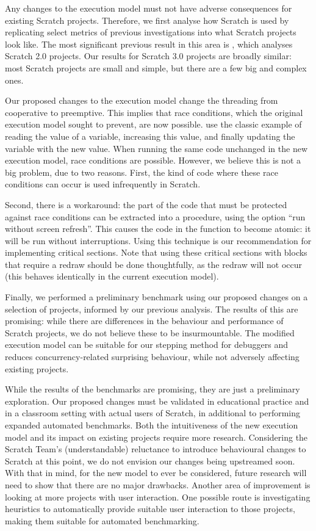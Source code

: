 \documentclass[../main]{subfiles}
\begin{document}
Any changes to the execution model must not have adverse consequences for existing Scratch projects.
Therefore, we first analyse how Scratch is used by replicating select metrics of previous investigations into what Scratch projects look like.
The most significant previous result in this area is \textcite{aivaloglouHowKidsCode2016}, which analyses Scratch 2.0 projects.
Our results for Scratch 3.0 projects are broadly similar: most Scratch projects are small and simple, but there are a few big and complex ones.

Our proposed changes to the execution model change the threading from cooperative to preemptive.
This implies that race conditions, which the original execution model sought to prevent, are now possible.
\Textcite{maloneyScratchProgrammingLanguage2010} use the classic example of reading the value of a variable, increasing this value, and finally updating the variable with the new value.
When running the same code unchanged in the new execution model, race conditions are possible.
However, we believe this is not a big problem, due to two reasons.
First, the kind of code where these race conditions can occur is used infrequently in Scratch.

Second, there is a workaround: the part of the code that must be protected against race conditions can be extracted into a procedure, using the option ``run without screen refresh''.
This causes the code in the function to become atomic: it will be run without interruptions.
Using this technique is our recommendation for implementing critical sections.
Note that using these critical sections with blocks that require a redraw should be done thoughtfully, as the redraw will not occur (this behaves identically in the current execution model).

Finally, we performed a preliminary benchmark using our proposed changes on a selection of projects, informed by our previous analysis.
The results of this are promising: while there are differences in the behaviour and performance of Scratch projects, we do not believe these to be insurmountable.
The modified execution model can be suitable for our stepping method for debuggers and reduces concurrency-related surprising behaviour, while not adversely affecting existing projects.

While the results of the benchmarks are promising, they are just a preliminary exploration.
Our proposed changes must be validated in educational practice and in a classroom setting with actual users of Scratch, in additional to performing expanded automated benchmarks.
Both the intuitiveness of the new execution model and its impact on existing projects require more research.
Considering the Scratch Team's (understandable) reluctance to introduce behavioural changes to Scratch at this point, we do not envision our changes being upstreamed soon.
With that in mind, for the new model to ever be considered, future research will need to show that there are no major drawbacks.
Another area of improvement is looking at more projects with user interaction.
One possible route is investigating heuristics to automatically provide suitable user interaction to those projects, making them suitable for automated benchmarking.
\end{document}
